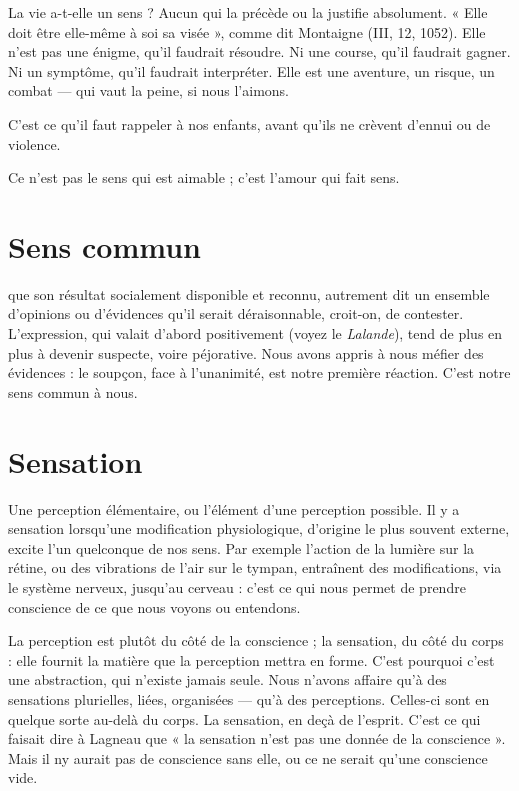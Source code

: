 La vie a-t-elle un sens ? Aucun qui la précède ou la justifie absolument.
« Elle doit être elle-même à soi sa visée », comme dit Montaigne (III, 12,
1052). Elle n’est pas une énigme, qu’il faudrait résoudre. Ni une course, qu’il
faudrait gagner. Ni un symptôme, qu’il faudrait interpréter. Elle est une aventure,
un risque, un combat — qui vaut la peine, si nous l’aimons.

C’est ce qu’il faut rappeler à nos enfants, avant qu’ils ne crèvent d’ennui ou
de violence.

Ce n’est pas le sens qui est aimable ; c’est l'amour qui fait sens.

\section{Sens commun}
que son résultat socialement disponible et reconnu, autrement
dit un ensemble d’opinions ou d’évidences qu’il serait déraisonnable,
croit-on, de contester. L'expression, qui valait d’abord positivement (voyez le
{\it Lalande}), tend de plus en plus à devenir suspecte, voire péjorative. Nous avons
appris à nous méfier des évidences : le soupçon, face à l’unanimité, est notre
première réaction. C’est notre sens commun à nous.

\section{Sensation}
Une perception élémentaire, ou l'élément d’une perception
possible. Il y a sensation lorsqu'une modification physiologique,
d’origine le plus souvent externe, excite l’un quelconque de nos sens. Par
exemple l’action de la lumière sur la rétine, ou des vibrations de l'air sur le
tympan, entraînent des modifications, via le système nerveux, jusqu’au
cerveau : c’est ce qui nous permet de prendre conscience de ce que nous voyons
ou entendons.

La perception est plutôt du côté de la conscience ; la sensation, du côté du
corps : elle fournit la matière que la perception mettra en forme. C’est pourquoi
c’est une abstraction, qui n’existe jamais seule. Nous n’avons affaire qu'à
des sensations plurielles, liées, organisées — qu’à des perceptions. Celles-ci sont
en quelque sorte au-delà du corps. La sensation, en deçà de l'esprit. C’est ce qui
faisait dire à Lagneau que « la sensation n’est pas une donnée de la conscience ».
Mais il ny aurait pas de conscience sans elle, ou ce ne serait qu’une conscience
vide.

